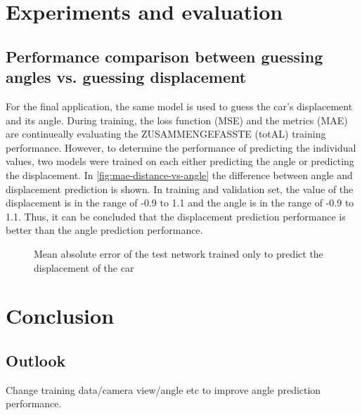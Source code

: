 \documentclass[10pt,a4paper,twoside,journal]{IEEEtran}
\begin{document}
\section{Experiments and evaluation}
\label{sc:evaluation}

\subsection{Performance comparison between guessing angles vs. guessing displacement}
For the final application, the same model is used to guess the car's displacement and its angle. During training, the loss function (MSE) and the metrics (MAE) are continueally evaluating the ZUSAMMENGEFASSTE (totAL) training performance. However, to determine the performance of predicting the individual values, two models were trained on each either predicting the angle or predicting the displacement. In \autoref{fig:mae-distance-vs-angle} the difference between angle and displacement prediction is shown. In training and validation set, the value of the displacement is in the range of -0.9 to 1.1 and the angle is in the range of -0.9 to 1.1. Thus, it can be concluded that the displacement prediction performance is better than the angle prediction performance. 

\begin{figure}
	\centering
	\caption{Mean absolute error of the test network trained only to predict the displacement of the car}
	\label{fig:mae-distance-vs-angle}
\end{figure}



\section{Conclusion}
\label{sc:conclusion}

\subsection{Outlook}
\label{ssc:outlook}
Change training data/camera view/angle etc to improve angle prediction performance.




\end{document}
